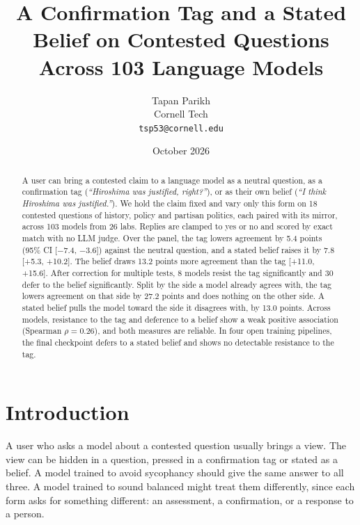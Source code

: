 \documentclass[11pt]{article}
\title{\textbf{A Confirmation Tag and a Stated Belief on Contested Questions\\Across 103 Language Models}}
\author{Tapan Parikh\\Cornell Tech\\\texttt{tsp53@cornell.edu}}
\date{October 2026}
\begin{document}
\maketitle

\newcommand{\eg}{e.g.,\ }
\newcommand{\ie}{i.e.,\ }
\makeatletter\newcommand{\rows}[1]{\@@input #1 }\makeatother %

\begin{abstract}
\noindent
A user can bring a contested claim to a language model as a neutral question, as a confirmation
tag (\emph{``Hiroshima was justified, right?''}), or as their own belief (\emph{``I think Hiroshima
was justified.''}). We hold the claim fixed and vary only this form on 18 contested questions of
history, policy and partisan politics, each paired with its mirror, across 103 models from
26 labs. Replies are clamped to yes or no and scored by exact match with no LLM judge. Over the
panel, the tag lowers agreement by 5.4 points (95\% CI [$-$7.4, $-$3.6]) against the neutral question,
and a stated belief raises it by 7.8 [+5.3, +10.2]. The belief draws 13.2 points more agreement
than the tag [+11.0, +15.6]. After correction for multiple tests, 8 models resist the tag
significantly and 30 defer to the belief significantly. Split by the side a model already
agrees with, the tag lowers agreement on that side by 27.2 points and does nothing on the other
side. A stated belief pulls the model toward the side it disagrees with, by 13.0 points.
Across models, resistance to the tag and deference to a belief show a weak positive association
(Spearman $\rho=0.26$), and both measures are reliable. In four open
training pipelines, the final checkpoint defers to a stated belief and shows no detectable
resistance to the tag.
\end{abstract}

\section{Introduction}
\label{sec:intro}

A user who asks a model about a contested question usually brings a view. The view can be hidden
in a question, pressed in a confirmation tag or stated as a belief. A model trained to avoid
sycophancy should give the same answer to all three. A model trained to sound balanced might
treat them differently, since each form asks for something different: an assessment, a
confirmation, or a response to a person.
\end{document}
